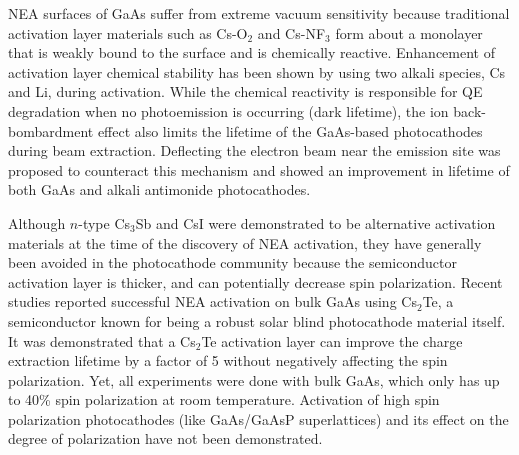 NEA surfaces of GaAs suffer from extreme vacuum sensitivity because traditional activation layer materials such as Cs-O$_2$ and Cs-NF$_3$ form about a monolayer that is weakly bound to the surface and is chemically reactive.\cite{kuriki2011_DarklifetimeDegradationGaAs,chanlek2014_DegradationQuantumEfficiency}
 Enhancement of activation layer chemical stability has been shown by using two alkali species, Cs and Li, during activation.\cite{mulhollan2008_EnhancedChemicalImmunity,sun2009_SurfaceActivationLayer,kurichiyanil2019test} 
While the chemical reactivity is responsible for QE degradation when no photoemission is occurring (dark lifetime), the ion back-bombardment effect also limits the lifetime of the GaAs-based photocathodes during beam extraction.
Deflecting the electron beam near the emission site was proposed to counteract this mechanism and showed an improvement in lifetime of both GaAs and alkali antimonide photocathodes.
\cite{grames2011_ChargeFluenceLifetime,mammei2013_ChargeLifetimeMeasurements,rahman2019_IncreasingChargeLifetime,cultrera2011_PhotocathodeBehaviorHigh} 

Although $n$-type Cs$_3$Sb and CsI were demonstrated to be alternative activation materials at the time of the discovery of NEA activation,\cite{sonnenberg1969, sonnenberg1969Cs,hagino1969,zhao1993,guo1996} they have generally been avoided in the photocathode community because the semiconductor activation layer is thicker, and can potentially decrease spin polarization.
Recent studies reported successful NEA activation on bulk GaAs using Cs$_2$Te,\cite{sugiyama2011_StudyElectronAffinity,uchida2014_STUDYROBUSTNESSNEAGAAS,kuriki2015_GaAsPhotocathodeActivation} a semiconductor known for being a robust solar blind photocathode material itself.\cite{michelato2008_Cs2TePHOTOCATHODESROBUSTNESS} It was demonstrated that a Cs$_2$Te activation layer can improve the charge extraction lifetime by a factor of 5 without negatively affecting the spin polarization.\cite{bae2018_RuggedSpinpolarizedElectron} Yet, all experiments were done with bulk GaAs, which only has up to 40\% spin polarization at room temperature. Activation of high spin polarization photocathodes (like GaAs/GaAsP superlattices) and its effect on the degree of polarization have not been demonstrated.

